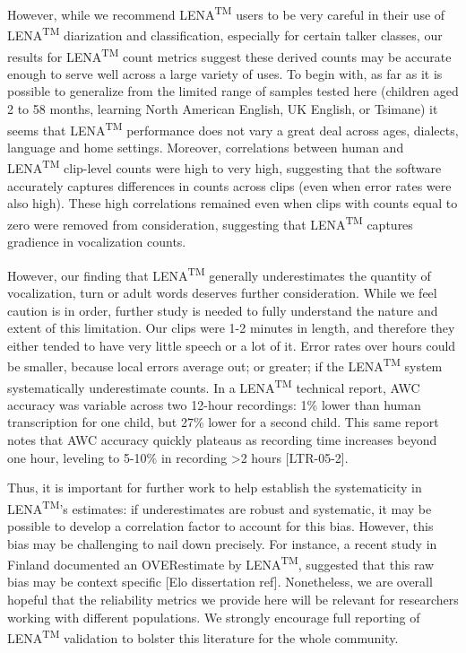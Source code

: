 \documentclass[english,floatsintext,man]{apa6}
\begin{document}
However, while we recommend LENA\textsuperscript{TM} users to be very
careful in their use of LENA\textsuperscript{TM} diarization and
classification, especially for certain talker classes, our results for
LENA\textsuperscript{TM} count metrics suggest these derived counts may
be accurate enough to serve well across a large variety of uses. To
begin with, as far as it is possible to generalize from the limited
range of samples tested here (children aged 2 to 58 months, learning
North American English, UK English, or Tsimane) it seems that
LENA\textsuperscript{TM} performance does not vary a great deal across
ages, dialects, language and home settings. Moreover, correlations
between human and LENA\textsuperscript{TM} clip-level counts were high
to very high, suggesting that the software accurately captures
differences in counts across clips (even when error rates were also
high). These high correlations remained even when clips with counts
equal to zero were removed from consideration, suggesting that
LENA\textsuperscript{TM} captures gradience in vocalization counts.

However, our finding that LENA\textsuperscript{TM} generally
underestimates the quantity of vocalization, turn or adult words
deserves further consideration. While we feel caution is in order,
further study is needed to fully understand the nature and extent of
this limitation. Our clips were 1-2 minutes in length, and therefore
they either tended to have very little speech or a lot of it. Error
rates over hours could be smaller, because local errors average out; or
greater; if the LENA\textsuperscript{TM} system systematically
underestimate counts. In a LENA\textsuperscript{TM} technical report,
AWC accuracy was variable across two 12-hour recordings: 1\% lower than
human transcription for one child, but 27\% lower for a second child.
This same report notes that AWC accuracy quickly plateaus as recording
time increases beyond one hour, leveling to 5-10\% in recording
\textgreater{}2 hours {[}LTR-05-2{]}.

Thus, it is important for further work to help establish the
systematicity in LENA\textsuperscript{TM}'s estimates: if underestimates
are robust and systematic, it may be possible to develop a correlation
factor to account for this bias. However, this bias may be challenging
to nail down precisely. For instance, a recent study in Finland
documented an OVERestimate by LENA\textsuperscript{TM}, suggested that
this raw bias may be context specific {[}Elo dissertation ref{]}.
Nonetheless, we are overall hopeful that the reliability metrics we
provide here will be relevant for researchers working with different
populations. We strongly encourage full reporting of
LENA\textsuperscript{TM} validation to bolster this literature for the
whole community.
\end{document}
